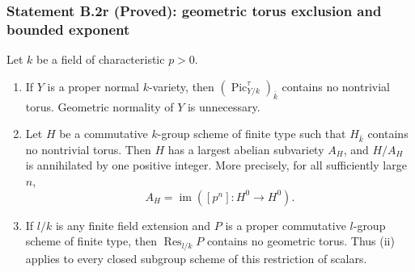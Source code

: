 \subsubsection*{Statement B.2r (Proved): geometric torus exclusion and bounded exponent}
\begin{proposition}\label{B:B2-no-torus-exponent}
Let $k$ be a field of characteristic $p>0$.
\begin{enumerate}
\item If $Y$ is a proper normal $k$-variety, then
$(\operatorname{Pic}^{\tau}_{Y/k})_{\bar k}$ contains no nontrivial
torus.  Geometric normality of $Y$ is unnecessary.
\item Let $H$ be a commutative $k$-group scheme of finite type such that
$H_{\bar k}$ contains no nontrivial torus.  Then $H$ has a largest
abelian subvariety $A_H$, and $H/A_H$ is annihilated by one positive
integer.  More precisely, for all sufficiently large $n$,
\[
 A_H=\operatorname{im}([p^n]:H^0\longrightarrow H^0).
\]
\item If $l/k$ is any finite field extension and $P$ is a
proper commutative $l$-group scheme of finite type, then
$\operatorname{Res}_{l/k}P$ contains no geometric torus.  Thus (ii)
applies to every closed subgroup scheme of this restriction of scalars.
\end{enumerate}
\end{proposition}
